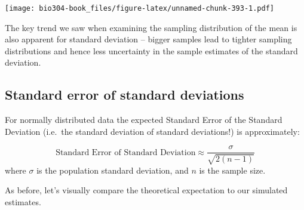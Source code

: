 \documentclass[]{book}
\theoremstyle{definition}
\theoremstyle{definition}
\theoremstyle{definition}
\theoremstyle{remark}
\begin{document}
\texttt{[image: bio304-book\_files/figure-latex/unnamed-chunk-393-1.pdf]}

The key trend we saw when examining the sampling distribution of the
mean is also apparent for standard deviation -- bigger samples lead to
tighter sampling distributions and hence less uncertainty in the sample
estimates of the standard deviation.

\hypertarget{standard-error-of-standard-deviations}{%
\subsection{Standard error of standard
deviations}\label{standard-error-of-standard-deviations}}

For normally distributed data the expected Standard Error of the
Standard Deviation (i.e.~the standard deviation of standard deviations!)
is approximately:

\[
\mbox{Standard Error of Standard Deviation} \approx \frac{\sigma}{\sqrt{2(n-1)}}
\] where \(\sigma\) is the population standard deviation, and \(n\) is
the sample size.

As before, let's visually compare the theoretical expectation to our
simulated estimates.
\end{document}

